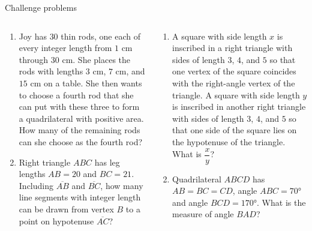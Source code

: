 \documentclass[9pt,aspectratio=169]{beamer}
\begin{document}
\begin{frame}{Challenge problems}
  \begin{columns}[T]
    \begin{column}{0.5\textwidth}
      \begin{enumerate}
        \item Joy has $30$ thin rods, one each of every integer length from $1$ cm through $30$ cm. She places the rods with lengths $3$ cm, $7$ cm, and $15$ cm on a table. She then wants to choose a fourth rod that she can put with these three to form a quadrilateral with positive area. How many of the remaining rods can she choose as the fourth rod? %
        \item Right triangle $ABC$ has leg lengths $AB=20$ and $BC=21$. Including $\overline{AB}$ and $\overline{BC}$, how many line segments with integer length can be drawn from vertex $B$ to a point on hypotenuse $\overline{AC}$? %
        \seti
      \end{enumerate}
    \end{column}
    \begin{column}{0.5\textwidth}
      \begin{enumerate}
        \conti
        \item A square with side length $x$ is inscribed in a right triangle with sides of length $3$, $4$, and $5$ so that one vertex of the square coincides with the right-angle vertex of the triangle. A square with side length $y$ is inscribed in another right triangle with sides of length $3$, $4$, and $5$ so that one side of the square lies on the hypotenuse of the triangle. What is $\dfrac{x}{y}$? %
        \item Quadrilateral $ABCD$ has $AB = BC = CD$, angle $ABC = 70°$ and angle $BCD = 170°$. What is the measure of angle $BAD$? %
      \end{enumerate}
    \end{column}
  \end{columns}
\end{frame}

\end{document}

